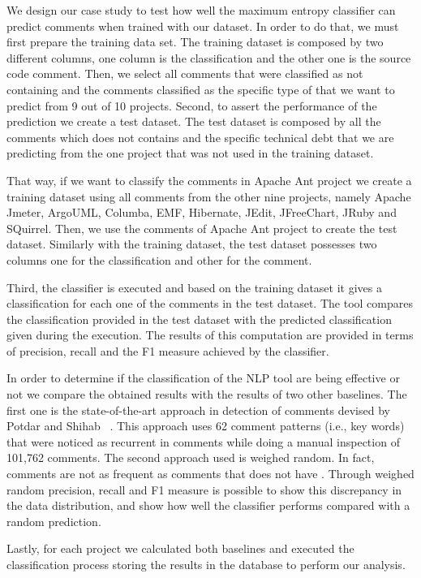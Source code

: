 We design our case study to test how well the maximum entropy classifier can predict \SATD comments when trained with our dataset. In order to do that, we must first prepare the training data set. The training dataset is composed by two different columns, one column is the classification and the other one is the source code comment. Then, we select all comments that were classified as not containing \SATD and the comments classified as the specific type of \SATD  that we want to predict from 9 out of 10 projects. Second, to assert the performance of the prediction we create a test dataset. The test dataset is composed by all the comments which does not contains \SATD and the specific technical debt that we are predicting from the one project that was not used in the training dataset. 

That way, if we want to classify the \SATD comments in Apache Ant project we create a training dataset using all comments from the other nine projects, namely Apache Jmeter, ArgoUML, Columba, EMF, Hibernate, JEdit, JFreeChart, JRuby and SQuirrel. Then, we use the comments of Apache Ant project to create the test dataset. Similarly with the training dataset, the test dataset possesses two columns one for the classification and other for the comment. 

Third, the classifier is executed and based on the training dataset it gives a classification for each one of the comments in the test dataset. The tool compares the classification provided in the test dataset with the predicted classification given during the execution. The results of this computation are provided in terms of precision, recall and the F1 measure achieved by the classifier.

In order to determine if the classification of the NLP tool are being effective or not we compare the obtained results with the results of two other baselines. The first one is the state-of-the-art approach in detection of \SATD comments devised by Potdar and Shihab ~\cite{Potdar2014ICSME}. This approach uses 62 comment patterns (i.e., key words) that were noticed as recurrent in \SATD comments while doing a manual inspection of 101,762 comments. The second approach used is weighed random. In fact, \SATD comments are not as frequent as comments that does not have \SATD. Through weighed random precision, recall and F1 measure is possible to show this discrepancy in the data distribution, and show how well the classifier performs compared with a random prediction.

Lastly, for each project we calculated both baselines and executed the classification process storing the results in the database to perform our analysis.

